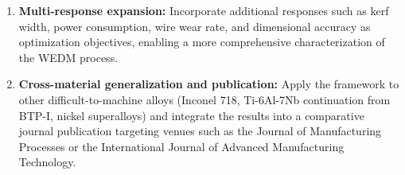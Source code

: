 \documentclass[12pt, a4paper]{report}
\begin{document}
\begin{enumerate}[topsep=2pt, itemsep=4pt]
    \item \textbf{Multi-response expansion:} Incorporate additional responses such as kerf width, power consumption, wire wear rate, and dimensional accuracy as optimization objectives, enabling a more comprehensive characterization of the WEDM process.

    \item \textbf{Cross-material generalization and publication:} Apply the framework to other difficult-to-machine alloys (Inconel 718, Ti-6Al-7Nb continuation from BTP-I, nickel superalloys) and integrate the results into a comparative journal publication targeting venues such as the Journal of Manufacturing Processes or the International Journal of Advanced Manufacturing Technology.
\end{enumerate}

\clearpage

\renewcommand{\bibname}{REFERENCES}
\singlespacing
\end{document}
